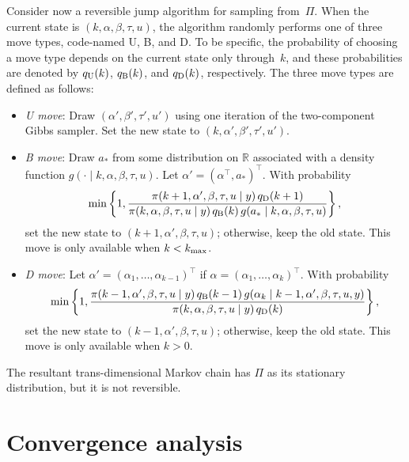 \documentclass[12pt]{article}
\begin{document}
	
	Consider now a reversible jump algorithm for sampling from~$\Pi$.
	When the current state is $(k,\alpha, \beta, \tau, u)$, the algorithm randomly performs one of three move types, code-named U, B, and D.
	To be specific, the probability of choosing a move type depends on the current state only through~$k$, and these probabilities are denoted by $q_{\scriptsize\mbox{U}}(k)$, $q_{\scriptsize\mbox{B}}(k)$, and $q_{\scriptsize\mbox{D}}(k)$, respectively.
	The three move types are defined as follows:
	\begin{itemize}
		\item {\it U move}: 
		Draw $(\alpha',\beta',\tau',u')$ using one iteration of the two-component Gibbs sampler.
		Set the new state to $(k,\alpha',\beta',\tau',u')$.
		
		\item {\it B move}: 
		Draw $a_*$ from some distribution on $\mathbb{R}$ associated with a density function $g(\cdot \mid k, \alpha, \beta, \tau, u)$.
		Let $\alpha' = (\alpha^{\top}, a_*)^{\top}$.
		With probability
		\[
		\min \left\{ 1, \frac{  \pi(k+1, \alpha', \beta, \tau, u \mid y) \, q_{\scriptsize\mbox{D}}(k+1) }{  \pi(k, \alpha, \beta, \tau, u \mid y) \, q_{\scriptsize\mbox{B}}(k) \, g(a_* \mid k, \alpha, \beta, \tau, u) } \right\},
		\]
		set the new state to $(k+1,\alpha',\beta,\tau,u)$;
		otherwise, keep the old state.
		This move is only available when $k < k_{\scriptsize \mbox{max}}$.
		\item {\it D move}: 
		Let $\alpha' = (\alpha_1, \dots, \alpha_{k-1})^{\top}$ if $\alpha = (\alpha_1, \dots, \alpha_k)^{\top}$.
		With probability
		\[
		\min \left\{ 1, \frac{  \pi(k - 1, \alpha', \beta, \tau, u \mid y) \, q_{\scriptsize\mbox{B}}(k-1) \, g(\alpha_k \mid k - 1, \alpha', \beta, \tau, u, y) }{  \pi(k, \alpha, \beta, \tau, u \mid y) \, q_{\scriptsize\mbox{D}}(k) } \right\},
		\]
		set the new state to $(k-1,\alpha', \beta, \tau, u)$;
		otherwise, keep the old state.
		This move is only available when $k > 0$.
	\end{itemize}
	
	
	
	{ The resultant trans-dimensional Markov chain has $\Pi$ as its stationary distribution, but it is not reversible.}
	
	
	
	
	
	
	\section{Convergence analysis}
	
\end{document}
